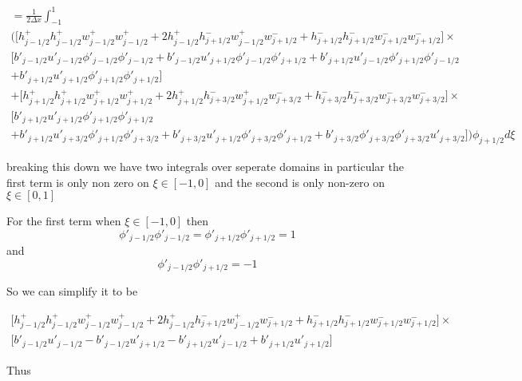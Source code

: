 \documentclass[12pt]{article}
\begin{document}
\begin{multline}
= \frac{1}{2\Delta x}\int_{-1}^{1} \\
 \bigg(\bigg[ h^+_{j-1/2}h^+_{j-1/2} w^+_{j-1/2}w^+_{j-1/2}  + 2h^+_{j-1/2}h^-_{j+1/2} w^+_{j-1/2} w^-_{j+1/2} + h^-_{j+1/2}h^-_{j+1/2} w^-_{j+1/2}w^-_{j+1/2}\bigg] \times \\\big[b'_{j-1/2}u'_{j-1/2} \phi'_{j-1/2} \phi'_{j-1/2} + b'_{j-1/2}u'_{j+1/2} \phi'_{j-1/2} \phi'_{j+1/2}  + b'_{j+1/2} u'_{j-1/2}\phi'_{j+1/2} \phi'_{j-1/2} \\+ b'_{j+1/2}u'_{j+1/2} \phi'_{j+1/2} \phi'_{j+1/2}  \big]  \\ +  \bigg[h^+_{j+1/2}h^+_{j+1/2} w^+_{j+1/2}w^+_{j+1/2}+ 2h^+_{j+1/2}h^-_{j+3/2} w^+_{j+1/2} w^-_{j+3/2} + h^-_{j+3/2}h^-_{j+3/2} w^-_{j+3/2}w^-_{j+3/2}\bigg] \times\\\big[ b'_{j+1/2}u'_{j+1/2} \phi'_{j+1/2} \phi'_{j+1/2} \\ +   b'_{j+1/2}u'_{j+3/2} \phi'_{j+1/2} \phi'_{j+3/2} +   b'_{j+3/2} u'_{j+1/2} \phi'_{j+3/2} \phi'_{j+1/2} +  b'_{j+3/2}\phi'_{j+3/2}  \phi'_{j+3/2} u'_{j+3/2}   \big]  \bigg) \phi_{j+1/2} d\xi
\end{multline}

breaking this down we have two integrals over seperate domains in particular the first term is only non zero on $\xi \in [-1,0]$ and the second is only non-zero on $\xi \in [0,1]$

For the first term when $\xi \in [-1,0]$ then
\[\phi'_{j-1/2} \phi'_{j-1/2} = \phi'_{j+1/2} \phi'_{j+1/2}  =1\]
and
\[\phi'_{j-1/2} \phi'_{j+1/2} = -1\]

So we can simplify it to be

\begin{multline*}
\bigg[ h^+_{j-1/2}h^+_{j-1/2} w^+_{j-1/2}w^+_{j-1/2}  + 2h^+_{j-1/2}h^-_{j+1/2} w^+_{j-1/2} w^-_{j+1/2} + h^-_{j+1/2}h^-_{j+1/2} w^-_{j+1/2}w^-_{j+1/2}\bigg] \times \\\big[b'_{j-1/2}u'_{j-1/2} - b'_{j-1/2}u'_{j+1/2}  - b'_{j+1/2} u'_{j-1/2} + b'_{j+1/2}u'_{j+1/2}  \big]
\end{multline*}

Thus
\end{document}
